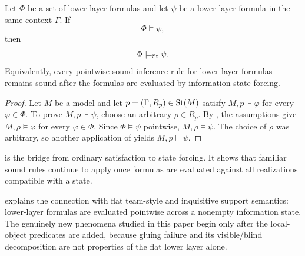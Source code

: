\begin{proposition}\label{prop:lifted-pointwise-soundness}
Let $\Phi$ be a set of lower-layer formulas and let $\psi$ be a lower-layer
formula in the same context $\Gamma$. If
\[
\Phi\models\psi,
\]
then
\[
\Phi\models_{\mathrm{St}}\psi .
\]
Equivalently, every pointwise sound inference rule for lower-layer formulas
remains sound after the formulas are evaluated by information-state forcing.
\end{proposition}

\begin{proof}
Let $M$ be a model and let $p=(\Gamma,R_p)\in\mathrm{St}(M)$ satisfy
$M,p\Vdash\varphi$ for every $\varphi\in\Phi$. To prove $M,p\Vdash\psi$, choose
an arbitrary $\rho\in R_p$. By , the assumptions give
$M,\rho\models\varphi$ for every $\varphi\in\Phi$. Since
$\Phi\models\psi$ pointwise, $M,\rho\models\psi$. The choice of $\rho$ was
arbitrary, so another application of  yields
$M,p\Vdash\psi$.
\end{proof}

 is the bridge from ordinary satisfaction to state forcing. It shows that familiar sound rules continue to apply once formulas are evaluated against all realizations compatible with a state.

\begin{remark}
 explains the connection with flat team-style and inquisitive support semantics: lower-layer formulas are evaluated pointwise across a nonempty information state. The genuinely new phenomena studied in this paper begin only after the local-object predicates are added, because gluing failure and its visible/blind decomposition are not properties of the flat lower layer alone.
\end{remark}
